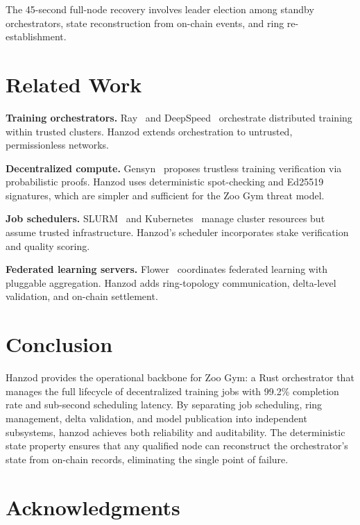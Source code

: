 \documentclass[11pt,letterpaper]{article}
\begin{document}
The 45-second full-node recovery involves leader election among standby orchestrators, state reconstruction from on-chain events, and ring re-establishment.

\section{Related Work}

\textbf{Training orchestrators.}  Ray~\cite{moritz2018ray} and DeepSpeed~\cite{rasley2020deepspeed} orchestrate distributed training within trusted clusters.  Hanzod extends orchestration to untrusted, permissionless networks.

\textbf{Decentralized compute.}  Gensyn~\cite{gensyn2023} proposes trustless training verification via probabilistic proofs.  Hanzod uses deterministic spot-checking and Ed25519 signatures, which are simpler and sufficient for the Zoo Gym threat model.

\textbf{Job schedulers.}  SLURM~\cite{yoo2003slurm} and Kubernetes~\cite{burns2016borg} manage cluster resources but assume trusted infrastructure.  Hanzod's scheduler incorporates stake verification and quality scoring.

\textbf{Federated learning servers.}  Flower~\cite{beutel2020flower} coordinates federated learning with pluggable aggregation.  Hanzod adds ring-topology communication, delta-level validation, and on-chain settlement.

\section{Conclusion}

Hanzod provides the operational backbone for Zoo Gym: a Rust orchestrator that manages the full lifecycle of decentralized training jobs with 99.2\% completion rate and sub-second scheduling latency.  By separating job scheduling, ring management, delta validation, and model publication into independent subsystems, hanzod achieves both reliability and auditability.  The deterministic state property ensures that any qualified node can reconstruct the orchestrator's state from on-chain records, eliminating the single point of failure.

\section*{Acknowledgments}
\end{document}
